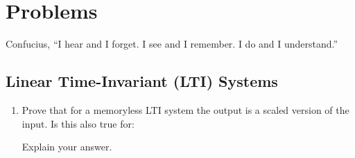 
\chapter{Problems}

\begin{chapquote}{Confucius, \textit{}}
``I hear and I forget. I see and I remember. I do and I understand.''
\end{chapquote}

\section{Linear Time-Invariant (LTI) Systems}
\begin{enumerate}
    \item Prove that for a memoryless LTI system the output is a scaled version of the input. Is this also true for:
    Explain your answer.

\end{enumerate}